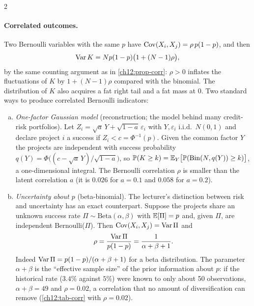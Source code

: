\begin{paracol}{2}
\paragraph{Correlated outcomes.}
Two Bernoulli variables with the same $p$ have $\operatorname{Cov}(X_i,X_j)=\rho\,p(1-p)$, and then
\begin{equation}\label{ch12:eq-varK}
  \operatorname{Var} K=Np(1-p)\bigl(1+(N-1)\rho\bigr),
\end{equation}
by the same counting argument as in \cref{ch12:prop-corr}: $\rho>0$ inflates the fluctuations of $K$ by
$1+(N-1)\rho$ compared with the binomial. The distribution of $K$ also acquires a fat right tail and a fat mass at
$0$. Two standard ways to produce correlated Bernoulli indicators:

\begin{enumerate}[(a)]
  \item \emph{One-factor Gaussian model} (reconstruction; the model behind many credit-risk portfolios). Let
        $Z_i=\sqrt a\,Y+\sqrt{1-a}\,\varepsilon_i$ with $Y,\varepsilon_i$ i.i.d.\ $N(0,1)$ and
        declare project $i$ a success if $Z_i<c=\Phi^{-1}(p)$. Given the common factor $Y$ the projects are independent with
        success probability $q(Y)=\Phi\bigl((c-\sqrt a\,Y)/\sqrt{1-a}\bigr)$, so
        $\mathbb{P}(K\ge k)=\mathbb{E}_Y\bigl[\mathbb{P}(\mathrm{Bin}(N,q(Y))\ge k)\bigr]$, a one-dimensional integral. The Bernoulli
        correlation $\rho$ is smaller than the latent correlation $a$ (it is $0.026$ for $a=0.1$ and $0.058$ for $a=0.2$).
  \item \emph{Uncertainty about $p$} (beta-binomial). The lecturer's distinction between risk and uncertainty has an exact
        counterpart. Suppose the projects share an unknown success rate $\Pi\sim\mathrm{Beta}(\alpha,\beta)$ with
        $\mathbb{E}[\Pi]=p$ and, given $\Pi$, are independent Bernoulli($\Pi$). Then $\operatorname{Cov}(X_i,X_j)=\operatorname{Var}\Pi$ and
        \begin{equation}\label{ch12:eq-rhobeta}
          \rho=\frac{\operatorname{Var}\Pi}{p(1-p)}=\frac{1}{\alpha+\beta+1}.
        \end{equation}
        Indeed $\operatorname{Var}\Pi=p(1-p)/(\alpha+\beta+1)$ for a beta distribution. The parameter $\alpha+\beta$ is the
        ``effective sample size'' of the prior information about $p$: if the historical rate ($3.4\%$ against $5\%$)
        were known to only about 50 observations, $\alpha+\beta=49$ and $\rho=0.02$, a correlation that no amount of
        diversification can remove (\cref{ch12:tab-corr} with $\rho=0.02$).
\end{enumerate}


\end{paracol}
